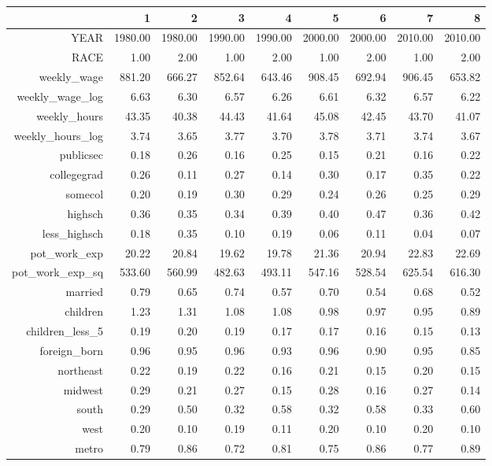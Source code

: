\begin{table}[ht]
\centering
\begin{tabular}{rrrrrrrrr}
  \hline
 & 1 & 2 & 3 & 4 & 5 & 6 & 7 & 8 \\ 
  \hline
YEAR & 1980.00 & 1980.00 & 1990.00 & 1990.00 & 2000.00 & 2000.00 & 2010.00 & 2010.00 \\ 
  RACE & 1.00 & 2.00 & 1.00 & 2.00 & 1.00 & 2.00 & 1.00 & 2.00 \\ 
  weekly\_wage & 881.20 & 666.27 & 852.64 & 643.46 & 908.45 & 692.94 & 906.45 & 653.82 \\ 
  weekly\_wage\_log & 6.63 & 6.30 & 6.57 & 6.26 & 6.61 & 6.32 & 6.57 & 6.22 \\ 
  weekly\_hours & 43.35 & 40.38 & 44.43 & 41.64 & 45.08 & 42.45 & 43.70 & 41.07 \\ 
  weekly\_hours\_log & 3.74 & 3.65 & 3.77 & 3.70 & 3.78 & 3.71 & 3.74 & 3.67 \\ 
  publicsec & 0.18 & 0.26 & 0.16 & 0.25 & 0.15 & 0.21 & 0.16 & 0.22 \\ 
  collegegrad & 0.26 & 0.11 & 0.27 & 0.14 & 0.30 & 0.17 & 0.35 & 0.22 \\ 
  somecol & 0.20 & 0.19 & 0.30 & 0.29 & 0.24 & 0.26 & 0.25 & 0.29 \\ 
  highsch & 0.36 & 0.35 & 0.34 & 0.39 & 0.40 & 0.47 & 0.36 & 0.42 \\ 
  less\_highsch & 0.18 & 0.35 & 0.10 & 0.19 & 0.06 & 0.11 & 0.04 & 0.07 \\ 
  pot\_work\_exp & 20.22 & 20.84 & 19.62 & 19.78 & 21.36 & 20.94 & 22.83 & 22.69 \\ 
  pot\_work\_exp\_sq & 533.60 & 560.99 & 482.63 & 493.11 & 547.16 & 528.54 & 625.54 & 616.30 \\ 
  married & 0.79 & 0.65 & 0.74 & 0.57 & 0.70 & 0.54 & 0.68 & 0.52 \\ 
  children & 1.23 & 1.31 & 1.08 & 1.08 & 0.98 & 0.97 & 0.95 & 0.89 \\ 
  children\_less\_5 & 0.19 & 0.20 & 0.19 & 0.17 & 0.17 & 0.16 & 0.15 & 0.13 \\ 
  foreign\_born & 0.96 & 0.95 & 0.96 & 0.93 & 0.96 & 0.90 & 0.95 & 0.85 \\ 
  northeast & 0.22 & 0.19 & 0.22 & 0.16 & 0.21 & 0.15 & 0.20 & 0.15 \\ 
  midwest & 0.29 & 0.21 & 0.27 & 0.15 & 0.28 & 0.16 & 0.27 & 0.14 \\ 
  south & 0.29 & 0.50 & 0.32 & 0.58 & 0.32 & 0.58 & 0.33 & 0.60 \\ 
  west & 0.20 & 0.10 & 0.19 & 0.11 & 0.20 & 0.10 & 0.20 & 0.10 \\ 
  metro & 0.79 & 0.86 & 0.72 & 0.81 & 0.75 & 0.86 & 0.77 & 0.89 \\ 
   \hline
\end{tabular}
\end{table}
